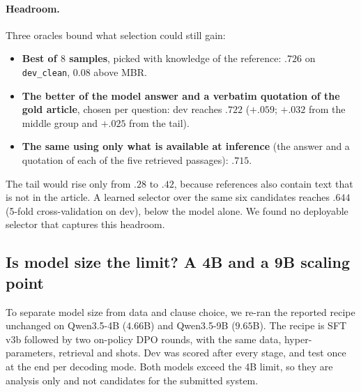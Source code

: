 \documentclass[11pt,a4paper]{article}
\begin{document}
\paragraph{Headroom.}
Three oracles bound what selection could still gain:
\begin{itemize}[leftmargin=*]
\item \textbf{Best of $8$ samples}, picked with knowledge of the reference: $.726$ on \texttt{dev\_clean}, $0.08$ above MBR.
\item \textbf{The better of the model answer and a verbatim quotation of the gold article}, chosen per question: dev reaches $.722$ ($+.059$; $+.032$ from the middle group and $+.025$ from the tail).
\item \textbf{The same using only what is available at inference} (the answer and a quotation of each of the five retrieved passages): $.715$.
\end{itemize}
The tail would rise only from $.28$ to $.42$, because references also contain text that is not in the article. A learned selector over the same six candidates reaches $.644$ (5-fold cross-validation on dev), below the model alone. We found no deployable selector that captures this headroom.

\subsection{Is model size the limit? A 4B and a 9B scaling point}\label{sec:scaling}
To separate model size from data and clause choice, we re-ran the reported recipe unchanged on Qwen3.5-4B ($4.66$B) and Qwen3.5-9B ($9.65$B). The recipe is SFT v3b followed by two on-policy DPO rounds, with the same data, hyper-parameters, retrieval and shots. Dev was scored after every stage, and test once at the end per decoding mode. Both models exceed the 4B limit, so they are analysis only and not candidates for the submitted system.
\end{document}
